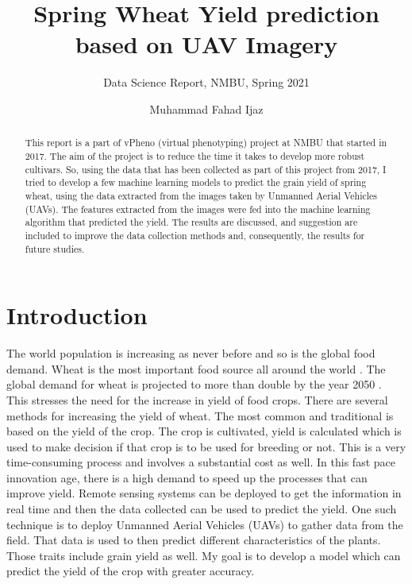 \documentclass[sigconf, nonacm, natbib, screen, balance=False]{acmart}
\begin{document}
\title{Spring Wheat Yield prediction based on UAV Imagery}
\subtitle{Data Science Report, NMBU, Spring 2021}

\author{Muhammad Fahad Ijaz}

\begin{abstract}
  This report is a part of vPheno (virtual phenotyping) project at NMBU that started in 2017. The aim of the project is to reduce the time it takes to develop more robust cultivars. So, using the data that has been collected as part of this project from 2017, I tried to develop a few machine learning models to predict the grain yield of spring wheat, using the data extracted from the images taken by Unmanned Aerial Vehicles (UAVs). The features extracted from the images were fed into the machine learning algorithm that predicted the yield. The results are discussed, and suggestion are included to improve the data collection methods and, consequently, the results for future studies.
\end{abstract}


\maketitle

\section{Introduction}\label{sec:intro}

The world population is increasing as never before and so is the global food demand. Wheat is the most important food source all around the world \cite{Igrejas2020}. The global demand for wheat is projected to more than double by the year 2050 \cite{tilman}. This stresses the need for the increase in yield of food crops.
There are several methods for increasing the yield of wheat. The most common and traditional is based on the yield of the crop. The crop is cultivated, yield is calculated which is used to make decision if that crop is to be used for breeding or not. This is a very time-consuming process and involves a substantial cost as well. In this fast pace innovation age, there is a high demand to speed up the processes that can improve yield. Remote sensing systems can be deployed to get the information in real time and then the data collected can be used to predict the yield. One such technique is to deploy Unmanned Aerial Vehicles (UAVs) to gather data from the field. That data is used to then predict different characteristics of the plants. Those traits include grain yield as well. My goal is to develop a model which can predict the yield of the crop with greater accuracy.
\end{document}
